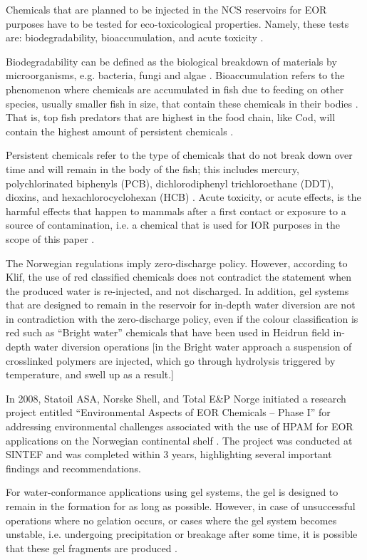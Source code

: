 Chemicals that are planned to be injected in the NCS reservoirs for EOR purposes have to be tested for eco-toxicological properties. Namely, these tests are: biodegradability, bioaccumulation, and acute toxicity \citep{Force2012}.

Biodegradability can be defined as the biological breakdown of materials by microorganisms, e.g. bacteria, fungi and algae \citep{Leja2010}. Bioaccumulation refers to the phenomenon where chemicals are accumulated in fish due to feeding on other species, usually smaller fish in size, that contain these chemicals in their bodies \citep{Beek2000}. That is, top fish predators that are highest in the food chain, like Cod, will contain the highest amount of persistent chemicals \citep{Koster2001}. 

Persistent chemicals refer to the type of chemicals that do not break down over time and will remain in the body of the fish; this includes mercury, polychlorinated biphenyls (PCB), dichlorodiphenyl trichloroethane (DDT), dioxins, and hexachlorocyclohexan (HCB) \citep{Adedipe2010}. Acute toxicity, or acute effects, is the harmful effects that happen to mammals after a first contact or exposure to a source of contamination, i.e. a chemical that is used for IOR purposes in the scope of this paper \citep{Cheremisinoff1996}.

The Norwegian regulations imply zero-discharge policy. However, according to Klif, the use of red classified chemicals does not contradict the statement when the produced water is re-injected, and not discharged. In addition, gel systems that are designed to remain in the reservoir for in-depth water diversion are not in contradiction with the zero-discharge policy, even if the colour classification is red such as “Bright water” chemicals that have been used in Heidrun field in-depth water diversion operations \citep{Am2010} [in the Bright water approach a suspension of crosslinked polymers are injected, which go through hydrolysis triggered by temperature, and swell up as a result.]

In 2008, Statoil ASA, Norske Shell, and Total E\&P Norge initiated a research project entitled “Environmental Aspects of EOR Chemicals – Phase I” for addressing environmental challenges associated with the use of HPAM for EOR applications on the Norwegian continental shelf \citep{Force2012}. The project was conducted at SINTEF and was completed within 3 years, highlighting several important findings and recommendations. 

For water-conformance applications using gel systems, the gel is designed to remain in the formation for as long as possible. However, in case of unsuccessful operations where no gelation occurs, or cases where the gel system becomes unstable, i.e. undergoing precipitation or breakage after some time, it is possible that these gel fragments are produced \citep{Force2012}.

